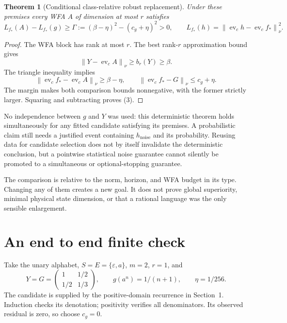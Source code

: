 \documentclass[11pt]{article}
\newtheorem{theorem}[definition]{Theorem}
\newcommand{\norm}[1]{\left\lVert #1\right\rVert}
\newcommand{\ev}{\operatorname{ev}}
\begin{document}
\begin{theorem}[Conditional class-relative robust replacement]
Under these premises every WFA $A$ of dimension at most $r$ satisfies
\[
 L_{f_*}(A)-L_{f_*}(g)\geq
 \Gamma:=(\beta-\eta)^2-(c_g+\eta)^2>0,
 \qquad L_{f_*}(h)=\norm{\ev_c h-\ev_c f_*}_\nu^2.
                                                               \tag{3}
\]
\end{theorem}
\begin{proof}
The WFA block has rank at most $r$. The best rank-$r$ approximation
bound gives
\[\norm{Y-\ev_c A}_\nu\geq b_r(Y)\geq\beta.\]
The triangle inequality implies
\[\norm{\ev_c f_*-\ev_c A}_\nu\geq\beta-\eta,\qquad
\norm{\ev_c f_*-G}_\nu\leq c_g+\eta.\]
The margin makes both comparison bounds nonnegative, with the former
strictly larger. Squaring and subtracting proves (3).
\end{proof}

No independence between $g$ and $Y$ was used: this deterministic theorem
holds simultaneously for any fitted candidate satisfying its premises.
A probabilistic claim still needs a justified event containing
$h_{\mathrm{noise}}$ and its probability. Reusing data for candidate
selection does not by itself invalidate the deterministic conclusion,
but a pointwise statistical noise guarantee cannot silently be promoted
to a simultaneous or optional-stopping guarantee.

The comparison is relative to the norm, horizon, and WFA budget in its
type. Changing any of them creates a new goal. It does not prove global
superiority, minimal physical state dimension, or that a rational language
was the only sensible enlargement.

\section{An end to end finite check}

Take the unary alphabet, $S=E=\{\varepsilon,a\}$, $m=2$, $r=1$, and
\[
 Y=G=\begin{pmatrix}1&1/2\\1/2&1/3\end{pmatrix},
 \qquad g(a^n)=1/(n+1),\qquad \eta=1/256.
\]
The candidate is supplied by the positive-domain recurrence in Section~1.
Induction checks its denotation; positivity verifies all denominators.
Its observed residual is zero, so choose $c_g=0$.
\end{document}
